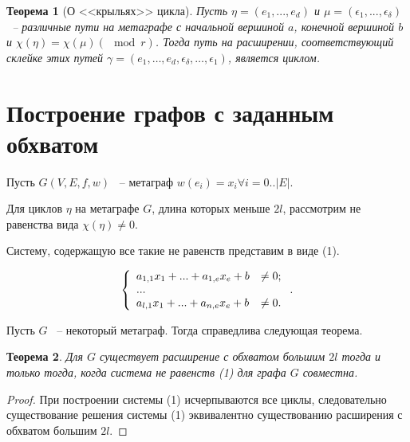 \documentclass[14pt]{mmcs-article}
\newtheorem{theorem}{Теорема}
\begin{document}
\begin{theorem}[О <<крыльях>> цикла]

Пусть $\eta = (e_1, ..., e_d)$ и $\mu = (\epsilon_1, ..., \epsilon_{\delta})$ ~-- различные пути на метаграфе с начальной вершиной $a$, конечной вершиной $b$ и $\chi(\eta) = \chi(\mu) (\mod{r})$. Тогда путь на расширении, соответствующий склейке этих путей $\gamma = (e_1, \dots, e_d, \epsilon_{\delta}, \dots, \epsilon_1)$, является циклом.

\end{theorem}

\section{Построение графов с заданным обхватом}

Пусть $G(V, E, f, w)$ ~-- метаграф $w(e_i) = x_i \forall i = 0..|E|$.

Для циклов $\eta$ на метаграфе $G$, длина которых меньше $2l$, рассмотрим не равенства вида $\chi(\eta) \neq 0$.

Систему, содержащую все такие не равенств представим в виде (1).

\begin{equation}
    \centering
    \left\{
        \begin{array}{ll}
            a_{1,1} x_1 + ... + a_{1,e} x_e + b &\neq 0 ; \\
            ...\\
            a_{l,1} x_1 + ... + a_{n,e} x_e + b &\neq 0 .\\
        \end{array}
    \right..
    \label{eqs:example}
\end{equation}

Пусть $G$ ~-- некоторый метаграф. Тогда справедлива следующая теорема.

\begin{theorem}

Для $G$ существует расширение с обхватом большим $2l$  тогда и только тогда, когда система не равенств (1) для графа $G$ совместна.

\end{theorem}

\begin{proof}

При построении системы (1) исчерпываются все циклы, следовательно существование решения системы (1) эквивалентно существованию расширения с обхватом большим $2l$.

\end{proof}
\end{document}
